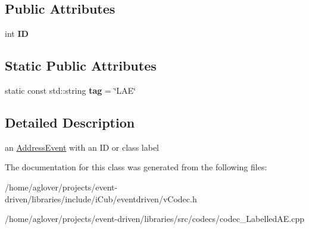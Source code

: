 \subsection*{Public Attributes}
\begin{DoxyCompactItemize}
\item 
int {\bfseries ID}\hypertarget{classev_1_1LabelledAE_a59a295976cdf867006deea22d7cf1942}{}\label{classev_1_1LabelledAE_a59a295976cdf867006deea22d7cf1942}

\end{DoxyCompactItemize}
\subsection*{Static Public Attributes}
\begin{DoxyCompactItemize}
\item 
static const std\+::string {\bfseries tag} = \char`\"{}L\+AE\char`\"{}\hypertarget{classev_1_1LabelledAE_a825f9f0819046248ce7f6d0af4871cec}{}\label{classev_1_1LabelledAE_a825f9f0819046248ce7f6d0af4871cec}

\end{DoxyCompactItemize}


\subsection{Detailed Description}
an \hyperlink{classev_1_1AddressEvent}{Address\+Event} with an ID or class label 

The documentation for this class was generated from the following files\+:\begin{DoxyCompactItemize}
\item 
/home/aglover/projects/event-\/driven/libraries/include/i\+Cub/eventdriven/v\+Codec.\+h\item 
/home/aglover/projects/event-\/driven/libraries/src/codecs/codec\+\_\+\+Labelled\+A\+E.\+cpp\end{DoxyCompactItemize}
